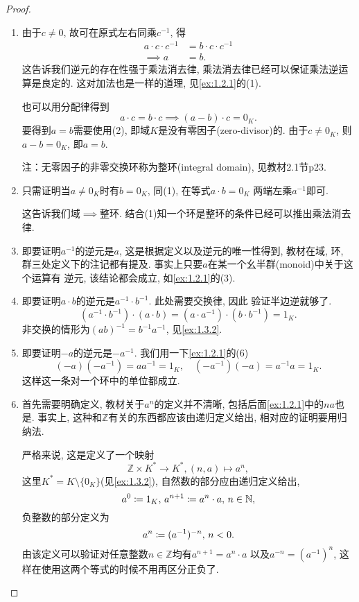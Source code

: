 \begin{proof}
    \begin{enumerate}[(1)]
        \item 由于$c \neq 0$, 故可在原式左右同乘$c^{-1}$, 得 
        \[ 
        \begin{aligned} 
            a \cdot c \cdot c^{-1} &= b \cdot c \cdot c^{-1}\\ 
            \implies a &= b.
        \end{aligned} 
        \]
        这告诉我们逆元的存在性强于乘法消去律, 乘法消去律已经可以保证乘法逆运算是良定的.
        这对加法也是一样的道理, 见\ref{ex:1.2.1}的(1).

        也可以用分配律得到
        \[
            a \cdot c = b \cdot c \implies (a - b) \cdot c = 0_K.
        \]
        要得到$a = b$需要使用(2), 即域$K$是没有零因子(zero-divisor)的. 由于$c \neq 0_K$,
    则$a - b = 0_K$, 即$a = b$.

        注：无零因子的非零交换环称为整环(integral domain), 见教材2.1节p23.
        \item 只需证明当$a \neq 0_K$时有$b = 0_K$, 同(1), 在等式$a \cdot b = 0_K$
    两端左乘$a^{-1}$即可.
        
        这告诉我们域$\implies$整环. 结合(1)知一个环是整环的条件已经可以推出乘法消去律.
        \item 即要证明$a^{-1}$的逆元是$a$, 这是根据定义以及逆元的唯一性得到, 教材在域, 
    环, 群三处定义下的注记都有提及. 事实上只要$a$在某一个幺半群(monoid)中关于这个运算有
    逆元, 该结论都会成立, 如\ref{ex:1.2.1}的(3).
        \item 即要证明$a \cdot b$的逆元是$a^{-1} \cdot b^{-1}$. 此处需要交换律, 因此
    验证半边逆就够了.
    \[
        (a^{-1} \cdot b^{-1}) \cdot (a \cdot b) = (a \cdot a^{-1}) \cdot (b \cdot b^{-1}) = 1_K.
    \]
    非交换的情形为$(ab)^{-1} = b^{-1}a^{-1}$, 见\ref{ex:1.3.2}.
        \item 即要证明$-a$的逆元是$-a^{-1}$. 我们用一下\ref{ex:1.2.1}的(6)
    \[
        (-a)(-a^{-1}) = aa^{-1} = 1_K, \quad (-a^{-1})(-a) = a^{-1}a = 1_K.
    \]
    这样这一条对一个环中的单位都成立.
        \item 首先需要明确定义, 教材关于$a^n$的定义并不清晰, 包括后面\ref{ex:1.2.1}中的$na$也是.
    事实上, 这种和$\mathbb{Z}$有关的东西都应该由递归定义给出, 相对应的证明要用归纳法.
        
        严格来说, 这是定义了一个映射
    \[
        \mathbb{Z} \times K^* \to K^*, (n, a) \mapsto a^n,
    \]
        这里$K^* = K \setminus \{0_K\}$(见\ref{ex:1.3.2}), 自然数的部分应由递归定义给出, 
    \[
        a^0 \mathrel{\coloneqq} 1_K,\, a^{n + 1} \mathrel{\coloneqq} a^n \cdot a,\, n \in \mathbb{N},
    \]
        负整数的部分定义为
    \[
        a^n \mathrel{\coloneqq} (a^{-1})^{-n},\, n < 0. 
    \]
    由该定义可以验证对任意整数$n \in \mathbb{Z}$均有$a^{n + 1} = a^n \cdot a$
    以及$a^{-n} = (a^{-1})^n$, 这样在使用这两个等式的时候不用再区分正负了.


\end{enumerate}
\end{proof}
